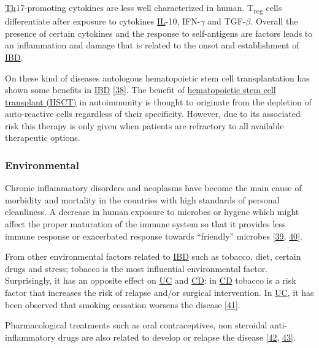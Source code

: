 \documentclass[
  12pt,
  a4paper,
  twoside,
  openright]{book}
\begin{document}
\protect\hyperlink{acronyms_Th}{Th}17-promoting cytokines are less well characterized in human.
T\textsubscript{reg} cells differentiate after exposure to cytokines \protect\hyperlink{acronyms_IL}{IL}-10, IFN-\(\gamma\) and TGF-\(\beta\).
Overall the presence of certain cytokines and the response to self-antigens are factors leads to an inflammation and damage that is related to the onset and establishment of \protect\hyperlink{acronyms_IBD}{IBD}.

On these kind of diseases autologous hematopoietic stem cell transplantation has shown some benefits in \protect\hyperlink{acronyms_IBD}{IBD} {[}\protect\hyperlink{ref-corraliza}{38}{]}.
The benefit of \protect\hyperlink{acronyms_HSCT}{hematopoietic stem cell transplant (HSCT)} in autoimmunity is thought to originate from the depletion of auto-reactive cells regardless of their specificity.
However, due to its associated risk this therapy is only given when patients are refractory to all available therapeutic options.

\hypertarget{environmental}{%
\subsubsection{Environmental}\label{environmental}}

Chronic inflammatory disorders and neoplasms have become the main cause of morbidity and mortality in the countries with high standards of personal cleanliness.
A decrease in human exposure to microbes or hygene which might affect the proper maturation of the immune system so that it provides less immune response or exacerbated response towards ``friendly'' microbes {[}\protect\hyperlink{ref-strachan1989}{39}, \protect\hyperlink{ref-scudellari2017}{40}{]}.

From other environmental factors related to \protect\hyperlink{acronyms_IBD}{IBD} such as tobacco, diet, certain drugs and stress; tobacco is the most influential environmental factor.
Surprisingly, it has an opposite effect on \protect\hyperlink{acronyms_UC}{UC} and \protect\hyperlink{acronyms_CD}{CD}: in \protect\hyperlink{acronyms_CD}{CD} tobacco is a risk factor that increases the risk of relapse and/or surgical intervention.
In \protect\hyperlink{acronyms_UC}{UC}, it has been observed that smoking cessation worsens the disease {[}\protect\hyperlink{ref-thomas1998}{41}{]}.

Pharmacological treatments such as oral contraceptives, non steroidal anti-inflammatory drugs are also related to develop or relapse the disease {[}\protect\hyperlink{ref-cornish2008}{42}, \protect\hyperlink{ref-kaufmann1987}{43}{]}.
\end{document}
